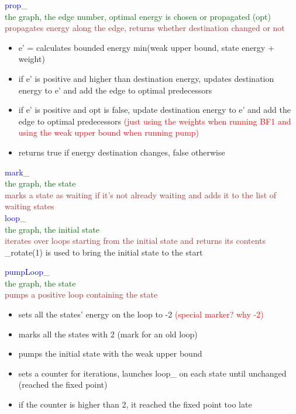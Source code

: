 \documentclass{rapport}
\begin{document}
\vspace{12pt}

\textcolor{blue}{prop_} \\
\textcolor[HTML]{006400}{the graph, the edge number, optimal energy is chosen or propagated (opt)}\\
\textcolor{brown}{propagates energy along the edge, returns whether destination changed or not}
\begin{itemize}
    \item e’ = calculates bounded energy min(weak upper bound, state energy + weight)
    \item if e’ is positive and higher than destination energy, updates destination energy to e’ and add the edge to optimal predecessors 
    \item if e’ is positive and opt is false, update destination energy to e’ and add the edge to optimal predecessors \textcolor{red}{(just using the weights when running BF1 and using the weak upper bound when running pump)}
    \item returns true if energy destination changes, false otherwise
\end{itemize}

\vspace{12pt}

\textcolor{blue}{mark_}\\
\textcolor[HTML]{006400}{the graph, the state}\\
\textcolor{brown}{marks a state as waiting if it’s not already waiting and adds it to the list of waiting states}\\

\textcolor{blue}{loop_}\\
\textcolor[HTML]{006400}{the graph, the initial state}\\
\textcolor{brown}{iterates over loops starting from the initial state and returns its contents}\\ 
\_rotate(1) is used to bring the initial state to the start\\ 

\newpage

\textcolor{blue}{pumpLoop_}\\
\textcolor[HTML]{006400}{the graph, the state}\\
\textcolor{brown}{pumps a positive loop containing the state}
\begin{itemize}
    \item sets all the states’ energy on the loop to -2 \textcolor{red}{(special marker? why -2)}
    \item marks all the states with 2 (mark for an old loop)
    \item pumps the initial state with the weak upper bound 
    \item sets a counter for iterations, launches loop\_ on each state until unchanged (reached the fixed point)
    \item if the counter is higher than 2, it reached the fixed point too late
\end{itemize}
\end{document}
